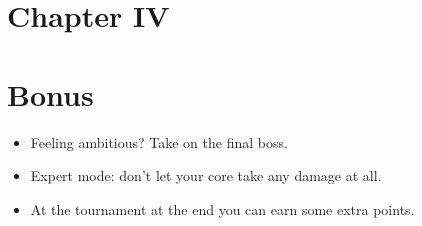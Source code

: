 \documentclass[12pt]{article}
\begin{document}
\newpage

\section*{\LARGE Chapter IV}
\section*{\LARGE Bonus}

\begin{itemize}
  \item Feeling ambitious? Take on the final boss.
  \item Expert mode: don't let your core take any damage at all.
  \item At the tournament at the end you can earn some extra points.
\end{itemize}
\end{document}
